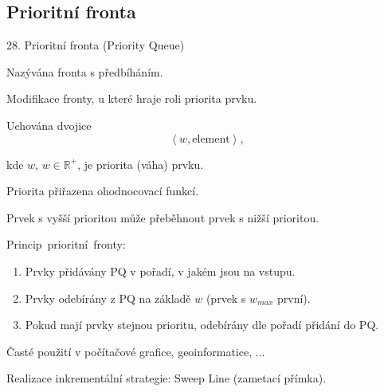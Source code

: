 \documentclass[czech]{beamer}
\begin{document}
\subsection{Prioritní fronta}
\begin{frame}{28. Prioritní fronta (Priority Queue)}

{\footnotesize Nazývána fronta s předbíháním.}{\footnotesize\par}

{\footnotesize Modifikace fronty, u které hraje roli priorita prvku.}{\footnotesize\par}

{\footnotesize\medskip{}
}{\footnotesize\par}

{\footnotesize Uchována dvojice 
\[
\left\langle w,\text{element}\right\rangle ,
\]
}{\footnotesize\par}

{\footnotesize kde $w$, $w\in\mathbb{R}^{+}$, je priorita (váha)
prvku.}{\footnotesize\par}

{\footnotesize\medskip{}
}{\footnotesize\par}

{\footnotesize Priorita přiřazena ohodnocovací funkcí.}{\footnotesize\par}

{\footnotesize Prvek s vyšší prioritou může přeběhnout prvek s nižší
prioritou.\medskip{}
}{\footnotesize\par}

{\footnotesize Princip~prioritní~fronty:}{\footnotesize\par}
\begin{enumerate}
\item {\footnotesize Prvky přidávány PQ v pořadí, v jakém jsou na vstupu.}{\footnotesize\par}
\item {\footnotesize Prvky odebírány z PQ na základě $w$ (prvek s $w_{max}$
první). }{\footnotesize\par}
\item {\footnotesize Pokud mají prvky stejnou prioritu, odebírány dle pořadí
přidání do PQ.}{\footnotesize\par}

{\footnotesize\medskip{}
}{\footnotesize\par}
\end{enumerate}
{\footnotesize Časté použití v počítačové grafice, geoinformatice,
...}{\footnotesize\par}

{\footnotesize Realizace inkrementální strategie: Sweep Line (zametací
přímka).}{\footnotesize\par}
\end{frame}
\end{document}
